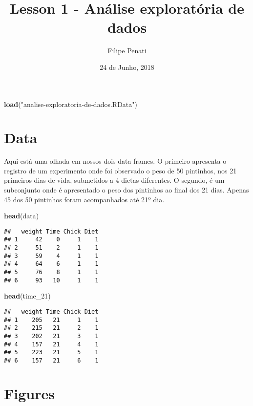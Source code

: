 \documentclass[]{article}
\title{Lesson 1 - Análise exploratória de dados}
\author{Filipe Penati}
\date{24 de Junho, 2018}
\newenvironment{Shaded}{\begin{snugshade}}{\end{snugshade}}
\newcommand{\KeywordTok}[1]{\textcolor[rgb]{0.13,0.29,0.53}{\textbf{#1}}}
\newcommand{\DecValTok}[1]{\textcolor[rgb]{0.00,0.00,0.81}{#1}}
\newcommand{\StringTok}[1]{\textcolor[rgb]{0.31,0.60,0.02}{#1}}
\newcommand{\NormalTok}[1]{#1}
\begin{document}
\maketitle

\begin{Shaded}
\begin{Highlighting}[]
\KeywordTok{load}\NormalTok{(}\StringTok{"analise-exploratoria-de-dados.RData"}\NormalTok{)}
\end{Highlighting}
\end{Shaded}

\section{Data}\label{data}

Aqui está uma olhada em nossos dois data frames. O primeiro apresenta o
registro de um experimento onde foi observado o peso de 50 pintinhos,
nos 21 primeiros dias de vida, submetidos a 4 dietas diferentes. O
segundo, é um subconjunto onde é apresentado o peso dos pintinhos ao
final dos 21 dias. Apenas 45 dos 50 pintinhos foram acompanhados até 21º
dia.

\begin{Shaded}
\begin{Highlighting}[]
\KeywordTok{head}\NormalTok{(data)}
\end{Highlighting}
\end{Shaded}

\begin{verbatim}
##   weight Time Chick Diet
## 1     42    0     1    1
## 2     51    2     1    1
## 3     59    4     1    1
## 4     64    6     1    1
## 5     76    8     1    1
## 6     93   10     1    1
\end{verbatim}

\begin{Shaded}
\begin{Highlighting}[]
\KeywordTok{head}\NormalTok{(time_}\DecValTok{21}\NormalTok{)}
\end{Highlighting}
\end{Shaded}

\begin{verbatim}
##   weight Time Chick Diet
## 1    205   21     1    1
## 2    215   21     2    1
## 3    202   21     3    1
## 4    157   21     4    1
## 5    223   21     5    1
## 6    157   21     6    1
\end{verbatim}

\section{Figures}\label{figures}
\end{document}
